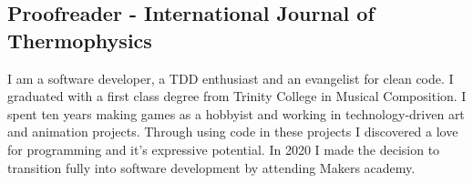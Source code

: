 \documentclass[12pt]{IEEEtran}
\begin{document}
\subsection*{Proofreader - International Journal of Thermophysics}

I am a software developer, a TDD enthusiast and an evangelist for clean code. I graduated with a first class degree from Trinity College in Musical Composition. I spent ten years making games as a hobbyist and working in technology-driven art and animation projects. Through using code in these projects I discovered a love for programming and it’s expressive potential. In 2020 I made the decision to transition fully into software development by attending Makers academy.







\newpage


\end{document}
